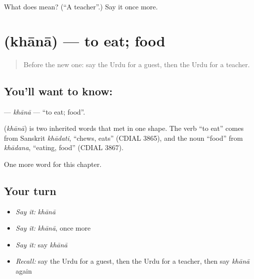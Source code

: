 \begin{tcolorbox}[breakable,colback=teal!4,colframe=teal!35!black,title={Before you move on}]
What does  mean? (\textquotedblleft{}A teacher\textquotedblright{}.) Say it once more.
\end{tcolorbox}
\section[\texorpdfstring{\ur{کھانا} (khānā)}{کھانا (khānā)}]{ (khānā) — to eat; food}

\label{lesson:UR-C46-khana}



\begin{quote}
Before the new one: say the Urdu for a guest, then the Urdu for a teacher.
\end{quote}

\subsection*{You'll want to know: }
\textbf{} — \emph{khānā} — \textquotedblleft{}to eat; food\textquotedblright{}.

\begin{cousinweb}
\textbf{} (\emph{khānā}) is two inherited words that met in one shape. The verb \textquotedblleft{}to eat\textquotedblright{} comes from Sanskrit \emph{khādati}, \textquotedblleft{}chews, eats\textquotedblright{} (CDIAL 3865), and the noun \textquotedblleft{}food\textquotedblright{} from \emph{khādana}, \textquotedblleft{}eating, food\textquotedblright{} (CDIAL 3867).
\end{cousinweb}

\begin{grammarlens}[title={What you've built}]
One more word for this chapter.
\end{grammarlens}

\subsection*{Your turn}
\begin{itemize}
\raggedright
  \item \emph{Say it:} \emph{khānā}
  \item \emph{Say it:} \emph{khānā}, once more
  \item \emph{Say it:} say \emph{khānā}
  \item \emph{Recall:} say the Urdu for a guest, then the Urdu for a teacher, then say \emph{khānā} again
\end{itemize}

